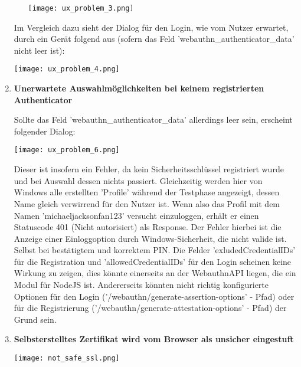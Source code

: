 \begin{enumerate}
\begin{enumerate}
\begin{center}
    \center
    \texttt{[image: ux\_problem\_3.png]}
\end{center}
\end{enumerate}

Im Vergleich dazu sieht der Dialog für den Login, wie vom Nutzer erwartet, durch ein Gerät folgend aus (sofern das Feld 'webauthn\_authenticator\_data' nicht leer ist):

\begin{center}
    \center
    \texttt{[image: ux\_problem\_4.png]}
\end{center}

\item \textbf{Unerwartete Auswahlmöglichkeiten bei keinem registrierten Authenticator}

Sollte das Feld 'webauthn\_authenticator\_data' allerdings leer sein, erscheint folgender Dialog:

\begin{center}
    \center
    \texttt{[image: ux\_problem\_6.png]}
\end{center}

Dieser ist insofern ein Fehler, da kein Sicherheitsschlüssel registriert wurde und bei Auswahl dessen nichts passiert. Gleichzeitig werden hier von Windows alle erstellten 'Profile' während der Testphase angezeigt, dessen Name gleich verwirrend für den Nutzer ist. Wenn also das Profil mit dem Namen 'michaeljacksonfan123' versucht einzuloggen, erhält er einen Statuscode 401 (Nicht autorisiert) als Response. Der Fehler hierbei ist die Anzeige einer Einloggoption durch Windows-Sicherheit, die nicht valide ist. Selbst bei bestätigtem und korrektem PIN. Die Felder 'exludedCredentialIDs' für die Registration und 'allowedCredentialIDs' für den Login scheinen keine Wirkung zu zeigen, dies könnte einerseits an der WebauthnAPI liegen, die ein Modul für NodeJS ist. Andererseits könnten nicht richtig konfigurierte Optionen für den Login ('/webauthn/generate-assertion-options' - Pfad) oder für die Registrierung ('/webauthn/generate-attestation-options' - Pfad) der Grund sein.

\item \textbf{Selbsterstelltes Zertifikat wird vom Browser als unsicher eingestuft}

\begin{center}
    \center
    \texttt{[image: not\_safe\_ssl.png]}
\end{center}


\end{enumerate}
